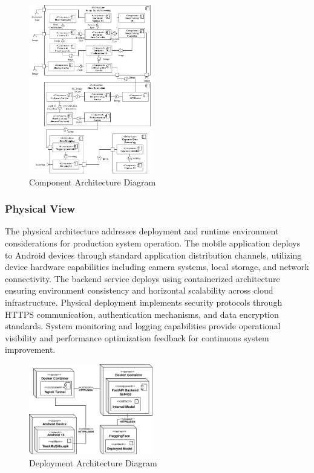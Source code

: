 \begin{figure}[htbp]
    \centering
    \includegraphics[width=0.48\textwidth]{images/component-diagram-eng.png}
    \caption{Component Architecture Diagram}
    \label{fig:component}
\end{figure}

\subsubsection{Physical View}
The physical architecture addresses deployment and runtime environment considerations for production system operation. The mobile application deploys to Android devices through standard application distribution channels, utilizing device hardware capabilities including camera systems, local storage, and network connectivity. The backend service deploys using containerized architecture ensuring environment consistency and horizontal scalability across cloud infrastructure. Physical deployment implements security protocols through HTTPS communication, authentication mechanisms, and data encryption standards. System monitoring and logging capabilities provide operational visibility and performance optimization feedback for continuous system improvement.

\begin{figure}[htbp]
    \centering
    \includegraphics[width=0.48\textwidth]{images/deployment-diagram.png}
    \caption{Deployment Architecture Diagram}
    \label{fig:deployment}
\end{figure}

